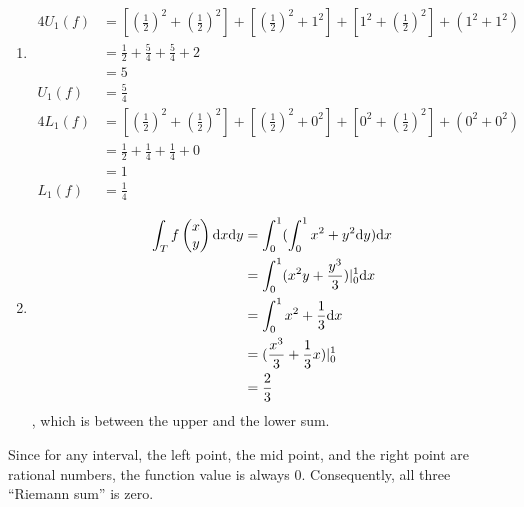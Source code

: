\documentclass{homework}
\begin{document}
\begin{problem}{2}
\begin{enumerate}
\item
\begin{align*}
4U_1(f) &= [(\frac{1}{2})^2 + (\frac{1}{2})^2] + [(\frac{1}{2})^2 + 1^2]
         + [1^2 + (\frac{1}{2})^2] + (1^2 + 1^2) \\
        &= \frac{1}{2} + \frac{5}{4} + \frac{5}{4} + 2 \\
        &= 5 \\
 U_1(f) &= \frac{5}{4}
\end{align*}
\begin{align*}
4L_1(f) &= [(\frac{1}{2})^2 + (\frac{1}{2})^2] + [(\frac{1}{2})^2 + 0^2]
         + [0^2 + (\frac{1}{2})^2] + (0^2 + 0^2) \\
        &= \frac{1}{2} + \frac{1}{4} + \frac{1}{4} + 0 \\
        &= 1 \\
 L_1(f) &= \frac{1}{4}
\end{align*}

\item
\begin{align*}
\int_T f\begin{pmatrix}x\\y\end{pmatrix} \mathrm{d}x \mathrm{d}y
&= \int_0^1(\int_0^1 x^2+y^2 \mathrm{d}y) \mathrm{d}x \\
&= \int_0^1 (x^2y + \frac{y^3}{3}) |_0^1 \mathrm{d}x \\
&= \int_0^1 x^2 + \frac{1}{3} \mathrm{d}x \\
&= (\frac{x^3}{3} + \frac{1}{3}x)|_0^1 \\
&= \frac{2}{3}
\end{align*}
, which is between the upper and the lower sum.
\end{enumerate}
\end{problem}

\begin{problem}{3}
Since for any interval, the left point, the mid point, and the right point are
rational numbers, the function value is always 0. Consequently, all three
``Riemann sum'' is zero.
\end{problem}
\end{document}
